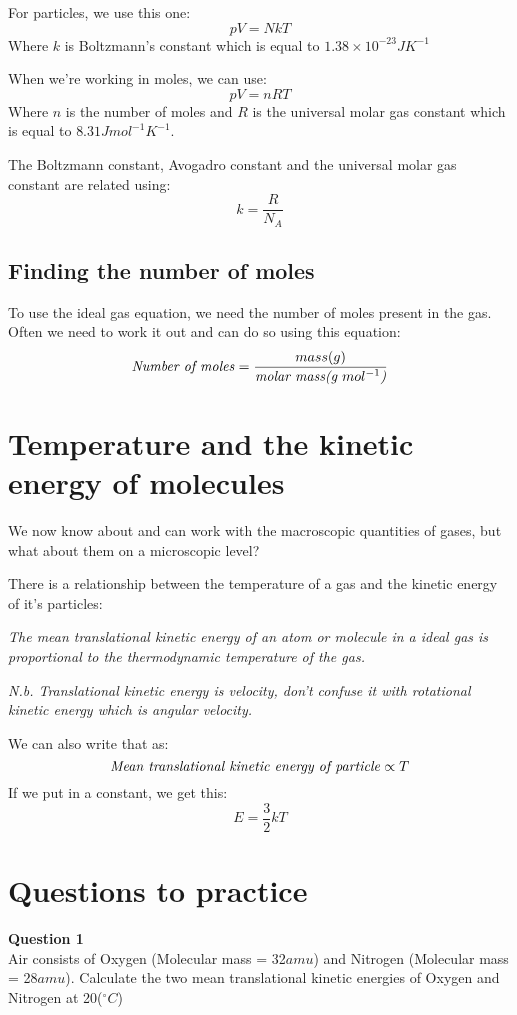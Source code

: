 \documentclass{article}
\begin{document}
For particles, we use this one:
\[
	pV = NkT
\]	
Where $k$ is Boltzmann's constant which is equal to
$1.38 \times 10^{-23}JK^{-1}$

When we're working in moles, we can use:
\[
	pV = nRT
\]
Where $n$ is the number of moles and $R$ is the universal molar gas constant
which is equal to $8.31Jmol^{-1}K^{-1}$.

The Boltzmann constant, Avogadro constant and the universal molar gas constant
are related using:
\[
	k = \frac{R}{N_A}
\]

\subsection*{Finding the number of moles}
To use the ideal gas equation, we need the number of moles present in the gas.
Often we need to work it out and can do so using this equation:
\[
	\textrm{\textit{Number of moles}} = \frac{mass(g)}{\textrm{\textit{molar
	mass(g $mol^{-1}$)}}}
\]

\section*{Temperature and the kinetic energy of molecules}
We now know about and can work with the macroscopic quantities of gases, but
what about them on a microscopic level?

There is a relationship between the temperature of a gas and the kinetic energy
of it's particles:

\textit{The mean translational kinetic energy of an atom or molecule in a ideal
gas is proportional to the thermodynamic temperature of the gas.}

\textit{N.b. Translational kinetic energy is velocity, don't confuse it with
rotational kinetic energy which is angular velocity.}

We can also write that as:
\[
	\textrm{\textit{Mean translational kinetic energy of particle}} \propto T
\]
If we put in a constant, we get this:
\[
	E = \frac{3}{2}kT
\]

\section*{Questions to practice}
\textbf{Question 1}\\
Air consists of Oxygen (Molecular mass = 32$amu$) and Nitrogen (Molecular mass =
28$amu$). Calculate the two mean translational kinetic energies of Oxygen and
Nitrogen at 20($^\circ C$)
\end{document}

